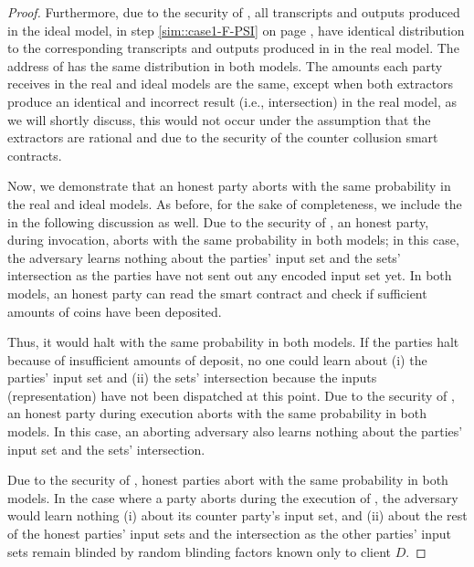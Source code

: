 \begin{proof}
Furthermore, due to the security of \fpsi, all transcripts and outputs produced in the ideal model, in step \ref{sim::case1-F-PSI} on page \pageref{sim::case1-F-PSI}, have identical distribution to the corresponding transcripts and outputs produced in \fpsi in the real model.  
%
The address of \SCtc has the same distribution in both models. The amounts each party receives in the real and ideal models are the same, except when both extractors produce an identical and incorrect result (i.e., intersection) in the real model, as we will shortly discuss, this would not occur under the assumption that the extractors are rational and due to the security of the counter collusion smart contracts.

  

  

Now, we demonstrate that an honest party aborts with the same probability in the real and ideal models. As before, for the sake of completeness, we include the \fpsi in the following discussion as well.  Due to the security of \ct, an honest party, during \ct invocation, aborts with the same probability in both models; in this case, the adversary learns nothing about the parties' input set and the sets' intersection as the parties have not sent out any encoded input set yet. In both models, an honest party can read the smart contract and check if sufficient amounts of coins have been deposited. 

Thus, it would halt with the same probability in both models.  If the parties halt because of insufficient amounts of deposit, no one could learn about (i) the parties' input set and (ii) the sets' intersection because the inputs (representation) have not been dispatched at this point.  Due to the security of \zspaa, an honest party during \zspaa execution aborts with the same probability in both models.  In this case, an aborting adversary also learns nothing about the parties' input set and the sets' intersection. %




Due to the security of \vopr, honest parties abort with the same probability in both models. In the case where a party aborts during the execution of \vopr, the adversary would learn nothing (i) about its counter party's input set, and (ii) about the rest of the honest parties' input sets and the intersection as the other parties' input sets remain blinded by random blinding factors known only to client $D$.


\end{proof}
